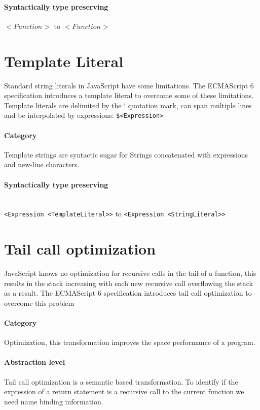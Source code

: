 \paragraph{Syntactically type preserving}
$<Function>$ to $<Function>$

\section{Template Literal}
Standard string literals in JavaScript have some limitations. The ECMAScript 6 specification introduces a template literal to overcome some of these limitations\cite[12.2.8]{SpecJS}. Template literals are delimited by the ` quotation mark, can span multiple lines and be interpolated by expressions: \lstinline{$<Expression>}

\paragraph{Category}
Template strings are syntactic sugar for Strings concatenated with expressions and new-line characters.

\paragraph{Syntactically type preserving} \mbox{}\\
\lstinline$<Expression <TemplateLiteral>>$ to \lstinline$<Expression <StringLiteral>>$

\section{Tail call optimization} \label{tail-call-optimization}
JavaScript knows no optimization for recursive calls in the tail of a function, this results in the stack increasing with each new recursive call overflowing the stack as a result.  The ECMAScript 6 specification introduces tail call optimization to overcome this problem\cite[14.6]{SpecJS}

\paragraph{Category}
Optimization, this transformation improves the space performance of a program.

\paragraph{Abstraction level}
Tail call optimization is a semantic based transformation. To identify if the expression of a return statement is a recursive call to the current function we need name binding information.

